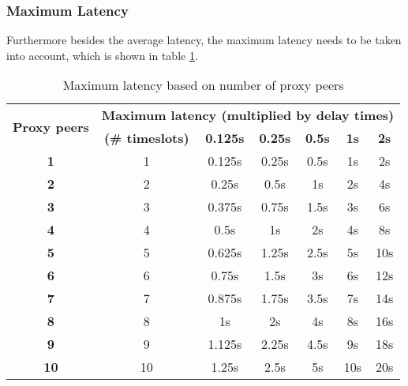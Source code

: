 \subsubsection{Maximum Latency}
Furthermore besides the average latency, the maximum latency needs
to be taken into account, which is shown in table \ref{maxlatencypeers}.
\begin{longtable}{|c|c|c|c|c|c|c|}
\caption{Maximum latency based on number of proxy peers}
\label{maxlatencypeers}\\
\hline
\multirow{2}{*}{\textbf{Proxy peers}} & \multicolumn{6}{|l|}{\textbf{Maximum latency (multiplied by delay times)}} \\
& \textbf{(\# timeslots)} & \textbf{0.125s} & \textbf{0.25s} & \textbf{0.5s} & \textbf{1s} & \textbf{2s}\\
\hline
\textbf{1} & 1 & 0.125s & 0.25s & 0.5s & 1s & 2s\\
\hline
\textbf{2} & 2 & 0.25s & 0.5s & 1s & 2s & 4s\\
\hline
\textbf{3} & 3 & 0.375s & 0.75s & 1.5s & 3s & 6s\\
\hline
\textbf{4} & 4 & 0.5s & 1s & 2s & 4s & 8s\\
\hline
\textbf{5} & 5 & 0.625s & 1.25s & 2.5s & 5s & 10s\\
\hline
\textbf{6} & 6 & 0.75s & 1.5s & 3s & 6s & 12s\\
\hline
\textbf{7} & 7 & 0.875s & 1.75s & 3.5s & 7s & 14s\\
\hline
\textbf{8} & 8 & 1s & 2s & 4s & 8s & 16s\\
\hline
\textbf{9} & 9 & 1.125s & 2.25s & 4.5s & 9s & 18s\\
\hline
\textbf{10} & 10 & 1.25s & 2.5s & 5s & 10s & 20s\\
\hline
\end{longtable}
